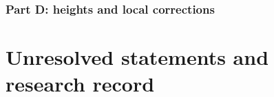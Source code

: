 \documentclass[11pt,a4paper]{article}
\numberwithin{equation}{section}
\theoremstyle{definition}
\theoremstyle{remark}
\begin{document}
\section{Part D: heights and local corrections}
\clearpage
\part{Unresolved statements and research record}


\end{document}
